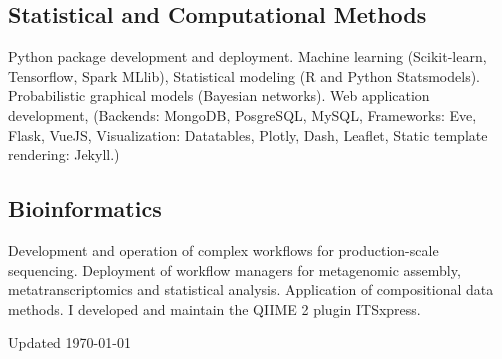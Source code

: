 \documentclass[12pt,letterpaper]{report}
\newcommand{\listitemspace}{0.15em}
\renewenvironment{itemize}
{\begin{list}{}{\setlength{\leftmargin}{0em}
            \setlength{\parskip}{0em}
            \setlength{\itemsep}{\listitemspace}
            \setlength{\parsep}{\listitemspace}}}
    {\end{list}}
\begin{document}
    \subsection*{Statistical and Computational Methods}

    \begin{itemize}

        \item Python package development and deployment. Machine learning (Scikit-learn, Tensorflow, Spark MLlib), Statistical modeling (R and Python Statsmodels). Probabilistic graphical models (Bayesian networks). Web application development, (Backends: MongoDB, PosgreSQL, MySQL, Frameworks: Eve, Flask, VueJS, Visualization: Datatables, Plotly, Dash, Leaflet, Static template rendering: Jekyll.)
        

    \end{itemize}

    \subsection*{Bioinformatics}

    \begin{itemize}

        \item Development and operation of complex workflows for production-scale sequencing. Deployment of workflow managers for metagenomic assembly, metatranscriptomics and statistical analysis. Application of compositional data methods. I developed and maintain the QIIME 2 plugin ITSxpress.

    \end{itemize}



    \begin{center}
        \vspace{6em}
        \vfill
        Updated \monthyeardate\today
    \end{center}
\end{document}
